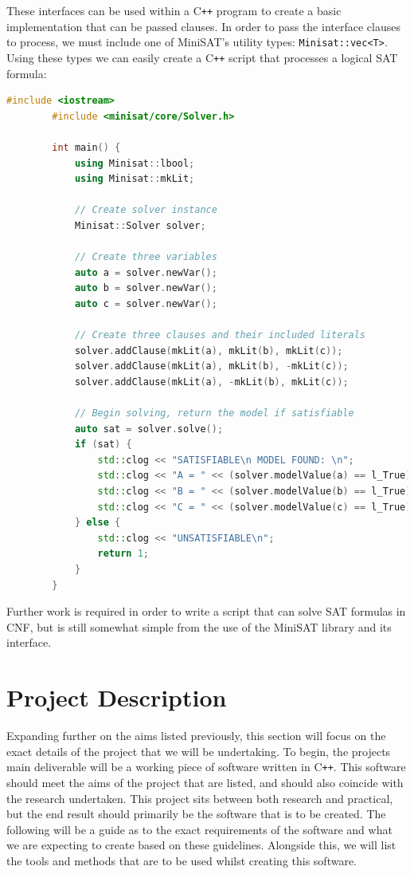 \documentclass{article}
\begin{document}
    These interfaces can be used within a C\texttt{++} program to create a basic implementation that can be passed clauses. In order to pass the
    interface clauses to process, we must include one of MiniSAT's utility types: \texttt{Minisat::vec<T>}. Using these types we can easily
    create a C\texttt{++} script that processes a logical SAT formula:

    \begin{lstlisting}[language=C++]
        #include <iostream>
        #include <minisat/core/Solver.h>

        int main() {
            using Minisat::lbool;
            using Minisat::mkLit;

            // Create solver instance
            Minisat::Solver solver;

            // Create three variables
            auto a = solver.newVar();
            auto b = solver.newVar();
            auto c = solver.newVar();

            // Create three clauses and their included literals
            solver.addClause(mkLit(a), mkLit(b), mkLit(c));
            solver.addClause(mkLit(a), mkLit(b), -mkLit(c));
            solver.addClause(mkLit(a), -mkLit(b), mkLit(c));

            // Begin solving, return the model if satisfiable
            auto sat = solver.solve();
            if (sat) {
                std::clog << "SATISFIABLE\n MODEL FOUND: \n";
                std::clog << "A = " << (solver.modelValue(a) == l_True) << '\n';
                std::clog << "B = " << (solver.modelValue(b) == l_True) << '\n';
                std::clog << "C = " << (solver.modelValue(c) == l_True) << '\n';
            } else {
                std::clog << "UNSATISFIABLE\n";
                return 1;
            }
        }
    \end{lstlisting}

    Further work is required in order to write a script that can solve SAT formulas in CNF, but is still somewhat simple from the use of the
    MiniSAT library and its interface.

\newpage
\section{Project Description}
Expanding further on the aims listed previously, this section will focus on the exact details of the project that we will be undertaking. To
begin, the projects main deliverable will be a working piece of software written in C\texttt{++}. This software should meet the aims of the
project that are listed, and should also coincide with the research undertaken. This project sits between both research and practical, but
the end result should primarily be the software that is to be created. The following will be a guide as to the exact requirements of the
software and what we are expecting to create based on these guidelines. Alongside this, we will list the tools and methods that are to be
used whilst creating this software.
\end{document}
